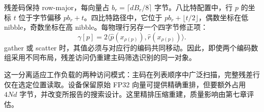 残差码保持 row-major，每向量占 $b_r=\lceil dB_r/8\rceil$ 字节。八比特配置中，行 $p$ 的坐标 $t$ 位于字节偏移 $pb_r+t$。四比特路径中，它位于 $pb_r+\lfloor t/2\rfloor$，偶数坐标在低 nibble，奇数坐标在高 nibble。每物理行另存一个四字节修正项：
\begin{equation}
 \gamma[ p ]=2\langle\widehat p(x_{\rho(p)}),
                              \widehat r(x_{\rho(p)})\rangle.
 \label{eq:4-correction}
\end{equation}
gather 或 scatter 时，其值必须与对应行的编码共同移动。因此，即使两个编码数组采用不同布局，残差访问仍重建主码筛选识别的同一对象。

这一分离适应工作负载的两种访问模式：主码在列表顺序中广泛扫描，完整残差行仅在选定位置读取。设备保留原始 FP32 向量可提供精确重排，但要额外占用 $4Nd$ 字节，并改变所报告的搜索设计。这里精排压缩重建，质量影响由第七章评估。
